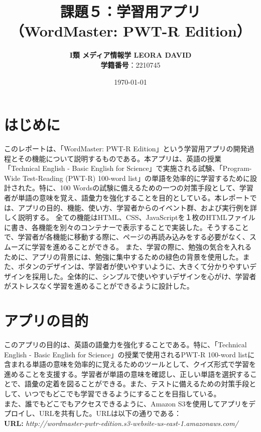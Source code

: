 \documentclass[]{jsarticle}
\title{\textbf{課題５：学習用アプリ\\（WordMaster: PWT-R Edition）}}
\author{\textbf{I類 メディア情報学 LEORA DAVID}\\\textbf{学籍番号}：2210745}
\date{\today}
\begin{document}
\maketitle

\newpage
\tableofcontents
\newpage

\section{はじめに}

このレポートは、「WordMaster: PWT-R Edition」という学習用アプリの開発過程とその機能について説明するものである。本アプリは、英語の授業「Technical English - Basic English for Science」で実施される試験、「Program-Wide Test-Reading (PWT-R) 100-word list」の単語を効率的に学習するために設計された。特に、100 Wordsの試験に備えるための一つの対策手段として、学習者が単語の意味を覚え、語彙力を強化することを目的としている。本レポートでは、アプリの目的、機能、使い方、学習者からのイベント群、および実行例を詳しく説明する。
全ての機能はHTML、CSS、JavaScriptを１枚のHTMLファイルに書き、各機能を別々のコンテナーで表示することで実装した。そうすることで、学習者が各機能に移動する際に、ページの再読み込みをする必要がなく、スムーズに学習を進めることができる。
また、学習の際に、勉強の気合を入れるために、アプリの背景には、勉強に集中するための緑色の背景を使用した。また、ボタンのデザインは、学習者が使いやすいように、大きくて分かりやすいデザインを採用した。全体的に、シンプルで使いやすいデザインを心がけ、学習者がストレスなく学習を進めることができるように設計した。

\section{アプリの目的}

このアプリの目的は、英語の語彙力を強化することである。特に、「Technical English - Basic English for Science」の授業で使用されるPWT-R 100-word listに含まれる単語の意味を効率的に覚えるためのツールとして、クイズ形式で学習を進めることを支援する。学習者が単語の意味を確認し、正しい単語を選択することで、語彙の定着を図ることができる。また、テストに備えるための対策手段として、いつでもどこでも学習できるようにすることを目指している。\\
\newline
また、誰でもどこでもアクセスできるように、Amazon S3を使用してアプリをデプロイし、URLを共有した。URLは以下の通りである：\\
\textbf{URL:} \textit{http://wordmaster-pwtr-edition.s3-website-us-east-1.amazonaws.com/}
\end{document}
